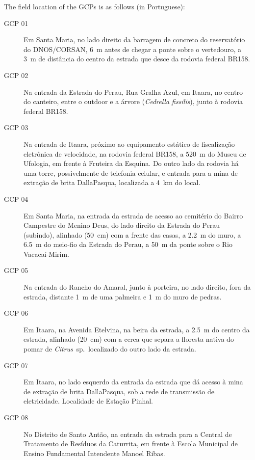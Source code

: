 The field location of the GCPs is as follows (in Portuguese):

\begin{description}
 \item [GCP 01] Em Santa Maria, no lado direito da barragem de concreto do reservatório do DNOS/CORSAN, 
 \SI{6}{\m} antes de chegar a ponte sobre o vertedouro, a \SI{3}{\m} de distância do centro da estrada que 
 desce da rodovia federal BR158.
 
 \item [GCP 02] Na entrada da Estrada do Perau, Rua Gralha Azul, em Itaara, no centro do canteiro, entre o 
 outdoor e a árvore (\textit{Cedrella fissilis}), junto à rodovia federal BR158.
 
 \item [GCP 03] Na entrada de Itaara, próximo ao equipamento estático de fiscalização eletrônica de 
 velocidade, na rodovia federal BR158, a \SI{520}{\m} do Museu de Ufologia, em frente à Fruteira da 
 Esquina. Do outro lado da rodovia há uma torre, possivelmente de telefonia celular, e entrada para a mina de 
 extração de brita DallaPasqua, localizada a \SI{4}{\km} do local.
 
 \item [GCP 04] Em Santa Maria, na entrada da estrada de acesso ao cemitério do Bairro Campestre do Menino 
 Deus, do lado direito da Estrada do Perau (subindo), alinhado (\SI{50}{\cm}) com a frente das casas, a
 \SI{2,2}{\m} do muro, a \SI{6,5}{\m} do meio-fio da Estrada do Perau, a \SI{50}{\m} da ponte sobre o Rio
 Vacacaí-Mirim.
 
 \item [GCP 05] Na entrada do Rancho do Amaral, junto à porteira, no lado direito, fora da estrada, distante 
 \SI{1}{\m} de uma palmeira e \SI{1}{\m} do muro de pedras.
 
 \item [GCP 06] Em Itaara, na Avenida Etelvina, na beira da estrada, a \SI{2,5}{\m} do centro da estrada,
 alinhado (\SI{20}{\cm}) com a cerca que separa a floresta nativa do pomar de \textit{Citrus}~sp.~localizado 
 do outro lado da estrada.
 
 \item [GCP 07] Em Itaara, no lado esquerdo da entrada da estrada que dá acesso à mina de extração de brita
 DallaPasqua, sob a rede de transmissão de eletricidade. Localidade de Estação Pinhal. 
 
 \item [GCP 08] No Distrito de Santo Antão, na entrada da estrada para a Central de Tratamento de Resíduos
 da Caturrita, em frente à Escola Municipal de Ensino Fundamental Intendente Manoel Ribas.
 

\end{description}
